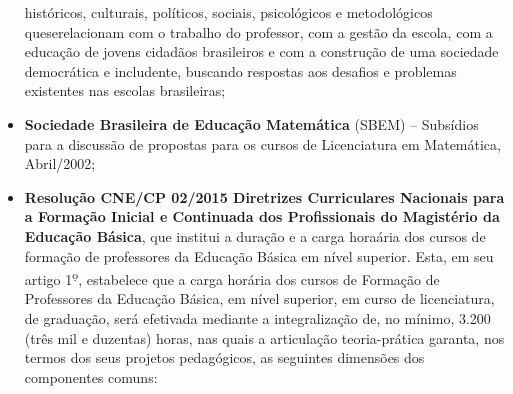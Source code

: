 \begin{itemize}[label=-]
  históricos, culturais, políticos, sociais, psicológicos e
  metodológicos queserelacionam com o trabalho do professor, com a
  gestão da escola, com a educação de jovens cidadãos brasileiros e
  com a construção de uma sociedade democrática e includente, buscando
  respostas aos desafios e problemas existentes nas escolas
  brasileiras;
\item \textbf{Sociedade Brasileira de Educa\c{c}\~{a}o Matem\'{a}tica}
  (SBEM) -- Subsídios para a discussão de propostas para os cursos de
  Licenciatura em Matemática, Abril/2002;
\item \textbf{Resolução CNE/CP 02/2015 Diretrizes Curriculares
    Nacionais para a Formação Inicial e Continuada dos Profissionais
    do Magistério da Educação Básica}, que institui a dura\c{c}\~{a}o
  e a carga hora\'{a}ria dos cursos de forma\c{c}\~{a}o de professores
  da Educa\c{c}\~{a}o B\'{a}sica em n\'{i}vel superior. Esta, em seu
  artigo 1\textsuperscript{\d o}, estabelece que a carga hor\'{a}ria
  dos cursos de Forma\c{c}\~{a}o de Professores da Educação Básica, em
  n\'{i}vel superior, em curso de licenciatura, de gradua\c{c}\~{a}o,
  ser\'{a} efetivada mediante a integraliza\c{c}\~{a}o de, no
  m\'{i}nimo, 3.200 (tr\^{e}s mil e duzentas) horas, nas quais a
  articula\c{c}\~{a}o teoria-pr\'{a}tica garanta, nos termos dos seus
  projetos pedag\'{o}gicos, as seguintes dimens\~{o}es dos componentes
  comuns: \\
  \vspace{1cm}\hfill {}
\end{itemize}

